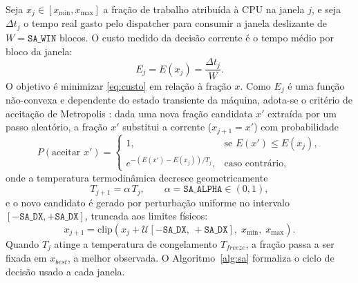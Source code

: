 \documentclass[12pt]{article}
\begin{document}
Seja $x_j \in [x_{\min}, x_{\max}]$ a fração de trabalho atribuída à CPU na
janela $j$, e seja $\Delta t_j$ o tempo real gasto pelo dispatcher para
consumir a janela deslizante de $W = \texttt{SA\_WIN}$ blocos. O custo
medido da decisão corrente é o tempo médio por bloco da janela:
\begin{equation}
  E_j = E(x_j) = \frac{\Delta t_j}{W}.
  \label{eq:custo}
\end{equation}
O objetivo é minimizar \eqref{eq:custo} em relação à fração $x$. Como $E_j$
é uma função não-convexa e dependente do estado transiente da máquina,
adota-se o critério de aceitação de Metropolis
\cite{metropolis:1953}: dada uma nova fração
candidata $x'$ extraída por um passo aleatório, a fração $x'$ substitui a
corrente ($x_{j+1} = x'$) com probabilidade
\begin{equation}
  P(\text{aceitar } x') = \begin{cases}
    1, & \text{se } E(x') \le E(x_j),\\
    e^{-\left(E(x') - E(x_j)\right)/T_j}, & \text{caso contrário},
  \end{cases}
  \label{eq:metropolis}
\end{equation}
onde a temperatura termodinâmica decresce geometricamente
\cite{kirkpatrick:1983}
\begin{equation}
  T_{j+1} = \alpha \, T_j, \qquad \alpha = \texttt{SA\_ALPHA} \in (0,1),
  \label{eq:temp}
\end{equation}
e o novo candidato é gerado por perturbação uniforme no intervalo
$[-\texttt{SA\_DX}, +\texttt{SA\_DX}]$, truncada aos limites físicos:
\begin{equation}
  x_{j+1} = \mathrm{clip}\!\left(x_j + \mathcal{U}[-\texttt{SA\_DX},\,
  +\texttt{SA\_DX}],\; x_{\min},\; x_{\max}\right).
  \label{eq:pertu}
\end{equation}
Quando $T_j$ atinge a temperatura de congelamento $T_{freeze}$, a fração
passa a ser fixada em $x_{best}$, a melhor observada. O
Algoritmo~\ref{alg:sa} formaliza o ciclo de decisão usado a cada janela.
\end{document}
